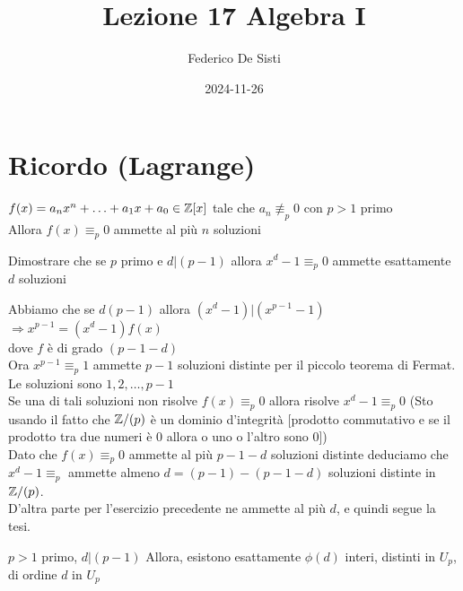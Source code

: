 \documentclass[12px]{article}
\title{Lezione 17 Algebra I}
\date{2024-11-26}
\author{Federico De Sisti}
\begin{document}
	\maketitle
	\newpage
	\section{Ricordo (Lagrange)}
	$f(x) = a_nx^n + \ldots + a_1 x + a_0\in \mathbb{Z}[x]$ tale che $a_n \not\equiv_p 0$ con  $p > 1$ primo \\
	Allora  $f(x)\equiv_p 0$ ammette al più  $n$ soluzioni
	\begin{coro}[Esercizio]
	Dimostrare che se $p$ primo e $d | (p-1)$ allora  $x^d -1 \equiv_p 0$ ammette esattamente  $d $ soluzioni
\end{coro}
\begin{dimo}[Soluzione]
	Abbiamo che se $d  (p-1)$ allora $(x^d -1) | (x^{p-1} - 1)$\\
	$  \Rightarrow x^{p-1} = (x^d-1)f(x)$\\
	dove $f$ è di grado $(p-1-d)$ \\
	Ora  $x^{p-1}\equiv_p 1$ ammette  $p-1$ soluzioni distinte per il piccolo teorema di Fermat. Le soluzioni sono  $1,2,\ldots, p-1$\\
	Se una di tali soluzioni non risolve  $f(x)\equiv_p 0$ allora risolve  $x^d-1\equiv_p 0$ (Sto usando il fatto che  $\mathbb{Z}/(p)$ è un dominio d'integrità [prodotto commutativo e se il prodotto tra due numeri è 0 allora o uno o l'altro sono 0])\\
	Dato che $ f(x)\equiv_p 0$ ammette al più $p-1-d$ soluzioni distinte deduciamo che $x^d - 1\equiv_p$ ammette almeno $d = (p-1)-(p-1-d)$ soluzioni distinte in  $\mathbb{Z}/(p)$.\\
	D'altra parte per l'esercizio precedente ne ammette al più $d$, e quindi segue la tesi.
\end{dimo}
\begin{coro}[Esercizio]
	$p> 1$ primo, $d | (p-1)$ Allora, esistono esattamente $\phi(d)$ interi, distinti in $U_p$, di ordine $d$ in $U_p$
\end{coro}
\end{document}
